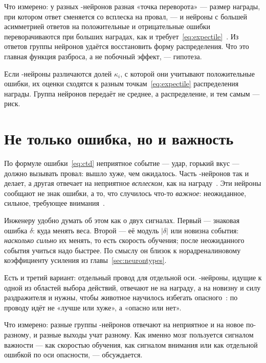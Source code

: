 Что измерено: у разных -нейронов разная «точка переворота» --- размер награды, при котором ответ сменяется со всплеска на провал, --- и нейроны с большей асимметрией ответов на положительные и отрицательные ошибки переворачиваются при больших наградах, как и требует~\eqref{eq:expectile}~\cite{Dabney2020}. Из ответов группы нейронов удаётся восстановить форму распределения. Что это главная функция разброса, а не побочный эффект, --- гипотеза.

\begin{keyblock}
\begin{proposition}
\label{prop:expectile}
Если -нейроны различаются долей $\kappa_i$, с которой они учитывают положительные ошибки, их оценки сходятся к разным точкам~\eqref{eq:expectile} распределения награды. Группа нейронов передаёт не среднее, а распределение, и тем самым --- риск.
\end{proposition}
\end{keyblock}

\section{Не только ошибка, но и важность}

По формуле ошибки~\eqref{eq:ctd} неприятное событие --- удар, горький вкус --- должно вызывать провал: вышло хуже, чем ожидалось. Часть -нейронов так и делает, а другая отвечает на неприятное \emph{всплеском}, как на награду~\cite{Matsumoto2009}. Эти нейроны сообщают не знак ошибки, а то, что случилось что-то \emph{важное}: неожиданное, сильное, требующее внимания~\cite{BrombergMartin2010}.

Инженеру удобно думать об этом как о двух сигналах. Первый --- знаковая ошибка $\delta$: куда менять веса. Второй --- её модуль $|\delta|$ или новизна события: \emph{насколько сильно} их менять, то есть скорость обучения; после неожиданного события учиться надо быстрее. По смыслу он близок к норадреналиновому коэффициенту усиления из главы~\ref{sec:neurontypes}.

Есть и третий вариант: отдельный провод для отдельной оси. -нейроны, идущие к одной из областей выбора действий, отвечают не на награду, а на новизну и силу раздражителя и нужны, чтобы животное научилось избегать опасного~\cite{Menegas2018}: по проводу идёт не «лучше или хуже», а «опасно или нет».

Что измерено: разные группы -нейронов отвечают на неприятное и на новое по-разному, и разные выходы учат разному. Как именно мозг пользуется сигналом важности --- как скоростью обучения, как сигналом внимания или как отдельной ошибкой по оси опасности, --- обсуждается.


